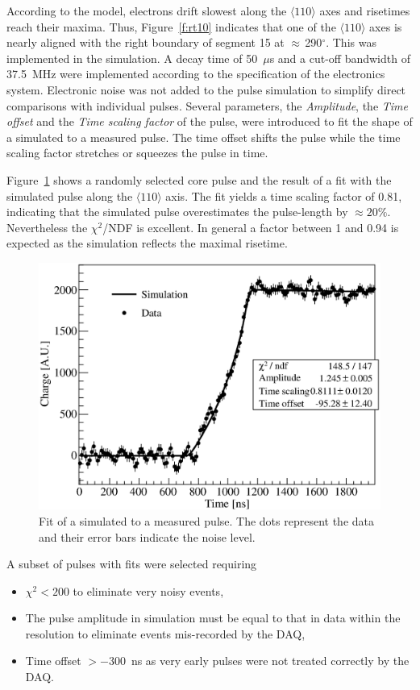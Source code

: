 \documentclass[epj]{svjour}
\begin{document}
According to the model, electrons drift slowest along the $\langle 110
\rangle$ axes and risetimes reach their maxima. Thus,
Figure~\ref{f:rt10} indicates that one of the $\langle 110 \rangle$
axes is nearly aligned with the right boundary of segment 15 at
$\approx$\,290$^\circ$. This was implemented in the simulation. A
decay time of 50~$\mu$s and a cut-off bandwidth of 37.5~MHz were
implemented according to the specification of the electronics
system. Electronic noise was not added to the pulse simulation to
simplify direct comparisons with individual pulses. Several
parameters, the \emph{Amplitude}, the \emph{Time offset} and the
\emph{Time scaling factor} of the pulse, were introduced to fit the
shape of a simulated to a measured pulse. The time offset shifts the
pulse while the time scaling factor stretches or squeezes the pulse in
time.

Figure~\ref{f:s2d} shows a randomly selected core pulse and the result
of a fit with the simulated pulse along the $\langle 110 \rangle$
axis. The fit yields a time scaling factor of 0.81, indicating that
the simulated pulse overestimates the pulse-length by $\approx
20\%$. Nevertheless the $\chi^{2}$/NDF is excellent. In general a
factor between 1 and 0.94 is expected as the simulation reflects the
maximal risetime.
\begin{figure}[htbp]
\centering
\includegraphics[width=\linewidth]{PSs2d}
\caption{Fit of a simulated to a measured pulse. The dots represent
the data and their error bars indicate the noise level.}
\label{f:s2d}
\end{figure}

A subset of pulses with fits were selected requiring
\begin{itemize}
\item $\chi^{2} < 200$ to eliminate very noisy events,
\item The pulse amplitude in simulation must be equal to that in data
within the resolution to eliminate events mis-recorded by the DAQ,
\item Time offset $> -300$~ns as very early pulses were not treated
correctly by the DAQ.
\end{itemize}
\end{document}
